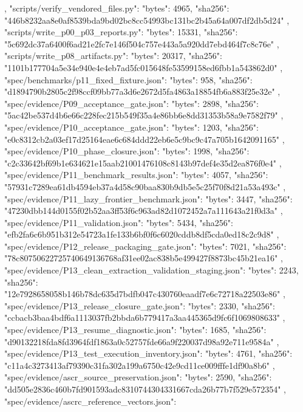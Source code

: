 {{{    },
    "scripts/verify_vendored_files.py": {
      "bytes": 4965,
      "sha256": "446b8232aa8e0af8539bda9bd02bc8cc54993bc131bc2b45a64a007df2db5d24"
    },
    "scripts/write_p00_p03_reports.py": {
      "bytes": 15331,
      "sha256": "5c692dc37a6400f6ad21e2fc7e146f504c757e443a5a920dd7ebd464f7c8c76e"
    },
    "scripts/write_p08_artifacts.py": {
      "bytes": 20317,
      "sha256": "1101b177704a5e34e940e4e4eb7ad5fc015648fe53599158ed6fbb1a543862d0"
    },
    "spec/benchmarks/p11_fixed_fixture.json": {
      "bytes": 958,
      "sha256": "d1894790b2805c2f98ccf09bb77a3d6e2672d5fa4863a18854fb6a883f25e32e"
    },
    "spec/evidence/P09_acceptance_gate.json": {
      "bytes": 2898,
      "sha256": "5ac42be537d4b6e66c228fec215b549f35a4e86bb6e8dd31353b58a9e7582f79"
    },
    "spec/evidence/P10_acceptance_gate.json": {
      "bytes": 1203,
      "sha256": "e0c8312cb2a03ef17d25164eae6c684ddd22eb6e5c9bc9c47a705b1642091165"
    },
    "spec/evidence/P10_phase_closure.json": {
      "bytes": 1998,
      "sha256": "c2c33642bf69b1e634621e15aab21001476108c8143b97def4e35d2ea876f0e4"
    },
    "spec/evidence/P11_benchmark_results.json": {
      "bytes": 4057,
      "sha256": "57931c7289ea61db4594eb37a4d58c90baa830b9db5e5c25f70f8d21a53a493c"
    },
    "spec/evidence/P11_lazy_frontier_benchmark.json": {
      "bytes": 3447,
      "sha256": "47230dbb144d0155f02b52aa3ff53f6c963ad82d1072452a7a111643a21f0d3a"
    },
    "spec/evidence/P11_validation.json": {
      "bytes": 5434,
      "sha256": "efb2fa6c6b951b312e54723a1fe133b6bf0f6c6020cddb8df5cda0ed18c2c9d8"
    },
    "spec/evidence/P12_release_packaging_gate.json": {
      "bytes": 7021,
      "sha256": "78c80750622725740649136768af31ee02ac838b5e499427f8873bc45b21ea16"
    },
    "spec/evidence/P13_clean_extraction_validation_staging.json": {
      "bytes": 2243,
      "sha256": "12e7928658058b146b78dc635d7bdfb047c430760eaadf7e6c72718a22503e86"
    },
    "spec/evidence/P13_release_closure_gate.json": {
      "bytes": 2330,
      "sha256": "ccbacb3baa4bdf6a1113037fb2bbda6b779417a3aa445365d9fc6f1069808633"
    },
    "spec/evidence/P13_resume_diagnostic.json": {
      "bytes": 1685,
      "sha256": "d90132218fda8fd3964fdf1863a0c52757fde66a9f220037d98a92e711e9584a"
    },
    "spec/evidence/P13_test_execution_inventory.json": {
      "bytes": 4761,
      "sha256": "c11a4c3273413af79390c31fa302a199a6750c42e9cd11ce009fffe1df90a8b6"
    },
    "spec/evidence/ascr_source_preservation.json": {
      "bytes": 2590,
      "sha256": "dd505e2836c460b7fd901593adc8310744304331667cda26b77b7f529e572354"
    },
    "spec/evidence/ascrc_reference_vectors.json": {
}}}
